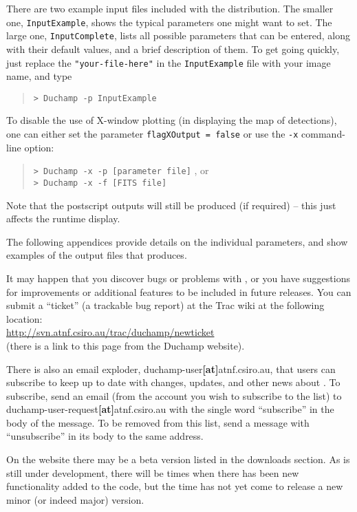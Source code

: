 There are two example input files included with the distribution. The
smaller one, \texttt{InputExample}, shows the typical parameters one
might want to set. The large one, \texttt{InputComplete}, lists all
possible parameters that can be entered, along with their default
values, and a brief description of them. To get going quickly, just
replace the \texttt{"your-file-here"} in the \texttt{InputExample}
file with your image name, and type
\begin{quote}
{\footnotesize
\texttt{> Duchamp -p InputExample}
}
\end{quote}

To disable the use of X-window plotting (in displaying the map of
detections), one can either set the parameter \texttt{flagXOutput =
false} or use the \texttt{-x} command-line option:
\begin{quote}
{\footnotesize
\texttt{> Duchamp -x -p [parameter file]}
}, or\\
{\footnotesize
\texttt{> Duchamp -x -f [FITS file]}
}
\end{quote}
Note that the postscript outputs will still be produced (if required)
-- this just affects the runtime display.

The following appendices provide details on the individual parameters,
and show examples of the output files that \duchamp produces.

It may happen that you discover bugs or problems with \duchamp, or you
have suggestions for improvements or additional features to be
included in future releases. You can submit a ``ticket'' (a trackable
bug report) at the \duchamp Trac wiki at the following location:\\
\href{http://svn.atnf.csiro.au/trac/duchamp/newticket}%
{http://svn.atnf.csiro.au/trac/duchamp/newticket}
\\(there is a link to this page from the Duchamp website).

There is also an email exploder, duchamp-user\textbf{[at]}atnf.csiro.au,
that users can subscribe to keep up to date with changes, updates, and
other news about \duchamp. To subscribe, send an email (from the
account you wish to subscribe to the list) to
duchamp-user-request\textbf{[at]}atnf.csiro.au with the single word
``subscribe'' in the body of the message. To be removed from this
list, send a message with ``unsubscribe'' in its body to the same
address.


On the \duchamp website there may be a beta version listed in the
downloads section. As \duchamp is still under development, there will
be times when there has been new functionality added to the code, but
the time has not yet come to release a new minor (or indeed major)
version. 

